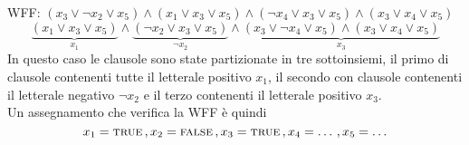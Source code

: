 \begin{exmp}
    WFF: $(x_3 \lor \lnot x_2 \lor x_5) \land (x_1 \lor x_3 \lor x_5) \land (\lnot x_4 \lor x_3 \lor x_5) \land (x_3 \lor x_4 \lor x_5)$\\
    \[
        \underbrace{(x_1 \lor x_3 \lor x_5)}_{x_1} \land 
        \underbrace{(\lnot x_2 \lor x_3 \lor x_5)}_{\lnot x_2} \land 
        \underbrace{(x_3 \lor \lnot x_4 \lor x_5) \land (x_3 \lor x_4 \lor x_5)}_{x_3}
    \]
    In questo caso le clausole sono state partizionate in tre sottoinsiemi, il 
    primo di clausole contenenti tutte il letterale positivo $x_1$, il secondo 
    con clausole contenenti il letterale negativo $\lnot x_2$ e il terzo 
    contenenti il letterale positivo $x_3$.\\
    Un assegnamento che verifica la WFF è quindi 
    \[
        x_1 = \textsc{true} \, , x_2 = \textsc{false} \, , x_3 = \textsc{true} \, , x_4=\ldots \, , x_5=\ldots
    \]
\end{exmp}

